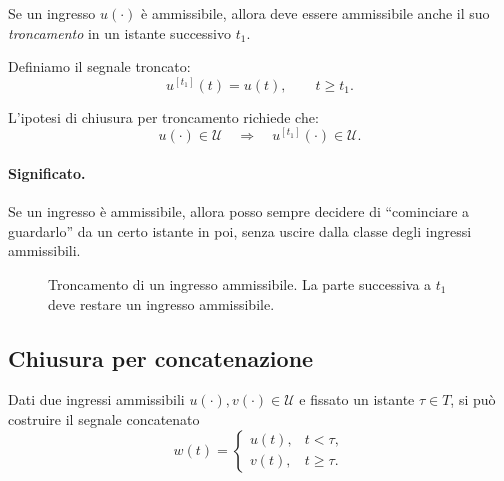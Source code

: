 Se un ingresso $u(\cdot)$ è ammissibile, allora deve essere ammissibile anche il suo \emph{troncamento} in un istante successivo $t_1$.

Definiamo il segnale troncato:
\[
u^{[t_1]}(t)=u(t), \qquad t\ge t_1.
\]

L'ipotesi di chiusura per troncamento richiede che:
\[
u(\cdot)\in\mathcal{U}
\quad \Longrightarrow \quad
u^{[t_1]}(\cdot)\in\mathcal{U}.
\]

\paragraph{Significato.}
Se un ingresso è ammissibile, allora posso sempre decidere di ``cominciare a guardarlo'' da un certo istante in poi, senza uscire dalla classe degli ingressi ammissibili.

\begin{figure}[H]
\centering
{}
\caption{Troncamento di un ingresso ammissibile. La parte successiva a $t_1$ deve restare un ingresso ammissibile.}
\end{figure}

\subsection{Chiusura per concatenazione}

Dati due ingressi ammissibili $u(\cdot),v(\cdot)\in\mathcal{U}$ e fissato un istante $\tau\in T$, si può costruire il segnale concatenato
\[
w(t)=
\begin{cases}
u(t), & t<\tau,\\[4pt]
v(t), & t\ge \tau.
\end{cases}
\]

